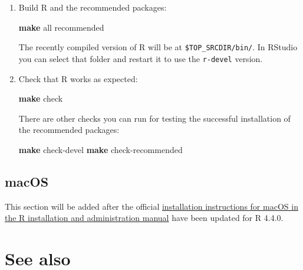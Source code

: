 \documentclass[
]{book}
\newenvironment{Shaded}{\begin{snugshade}}{\end{snugshade}}
\newcommand{\BuiltInTok}[1]{#1}
\newcommand{\FunctionTok}[1]{\textcolor[rgb]{0.13,0.29,0.53}{\textbf{#1}}}
\newcommand{\NormalTok}[1]{#1}
\newcommand{\StringTok}[1]{\textcolor[rgb]{0.31,0.60,0.02}{#1}}
\newcommand{\VariableTok}[1]{\textcolor[rgb]{0.00,0.00,0.00}{#1}}
\begin{document}
\begin{enumerate}
\begin{Shaded}
\end{Shaded}
\item
  Build R and the recommended packages:

\begin{Shaded}
\begin{Highlighting}[]
\FunctionTok{make}\NormalTok{ all recommended}
\end{Highlighting}
\end{Shaded}

  The recently compiled version of R will be at \texttt{\$TOP\_SRCDIR/bin/}.
  In RStudio you can select that folder and restart it to use the \texttt{r-devel} version.
\item
  Check that R works as expected:

\begin{Shaded}
\begin{Highlighting}[]
\FunctionTok{make}\NormalTok{ check}
\end{Highlighting}
\end{Shaded}

  There are other checks you can run for testing the successful installation of the recommended packages:

\begin{Shaded}
\begin{Highlighting}[]
\FunctionTok{make}\NormalTok{ check{-}devel}
\FunctionTok{make}\NormalTok{ check{-}recommended}
\end{Highlighting}
\end{Shaded}
\end{enumerate}

\subsection{macOS}\label{macos}

This section will be added after the official \href{https://cran.r-project.org/doc/manuals/r-devel/R-admin.html\#macOS}{installation instructions for macOS in the R installation and administration manual} have been updated for R 4.4.0.

\section{See also}\label{see-also}
\end{document}
